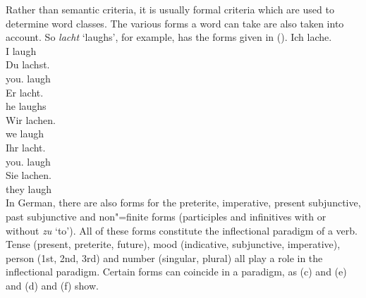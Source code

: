 Rather than semantic criteria, it is usually formal criteria which are used to determine word classes. The various forms a word can take
are also taken into account. So \emph{lacht} `laughs', for example, has the forms given in (). 
\eal
\ex 
\gll Ich lache.\\
     I laugh\\
\ex 
\gll Du lachst.\\
     you.\SG{} laugh\\
\ex 
\gll Er lacht.\\
     he laughs\\
\ex 
\gll Wir lachen.\\
     we laugh\\
\ex 
\gll Ihr lacht.\\
     you.\PL{} laugh\\
\ex 
\gll Sie lachen.\\
     they laugh\\
\zl
In German, there are also forms for the preterite, imperative, present subjunctive, past subjunctive and non"=finite forms 
(participles and infinitives with or without \emph{zu} `to'). All of these forms constitute the
inflectional paradigm of a verb. Tense  (present,
preterite, future),
mood (indicative, subjunctive, imperative),
person (1st, 2nd, 3rd) and number (singular, plural) all play a role in the
inflectional paradigm. Certain forms can coincide in a paradigm, as (c) and (e) and
(d) and (f) show.

